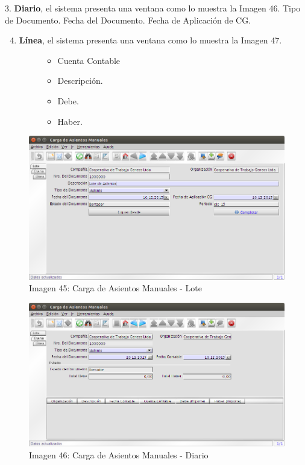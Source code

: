 \documentclass[letterpaper,10pt,spanish]{sphinxmanual}
\begin{document}
3. \textbf{Diario},  el sistema presenta una ventana como lo muestra la Imagen 46.
Tipo de Documento.
Fecha del Documento.
Fecha de Aplicación de CG.
\begin{enumerate}
\setcounter{enumi}{3}
\item {} \begin{description}
\item[{\textbf{Línea},  el sistema presenta una ventana como lo muestra la Imagen 47.}] \leavevmode\begin{itemize}
\item {} 
Cuenta Contable

\item {} 
Descripción.

\item {} 
Debe.

\item {} 
Haber.

\end{itemize}

\end{description}

\end{enumerate}
\begin{figure}[htbp]
\centering
\capstart

\includegraphics{ly_contabilidad_45.png}
\caption{Imagen 45: Carga de Asientos Manuales - Lote}\end{figure}
\begin{figure}[htbp]
\centering
\capstart

\includegraphics{ly_contabilidad_46.png}
\caption{Imagen 46: Carga de Asientos Manuales - Diario}\end{figure}
\end{document}
